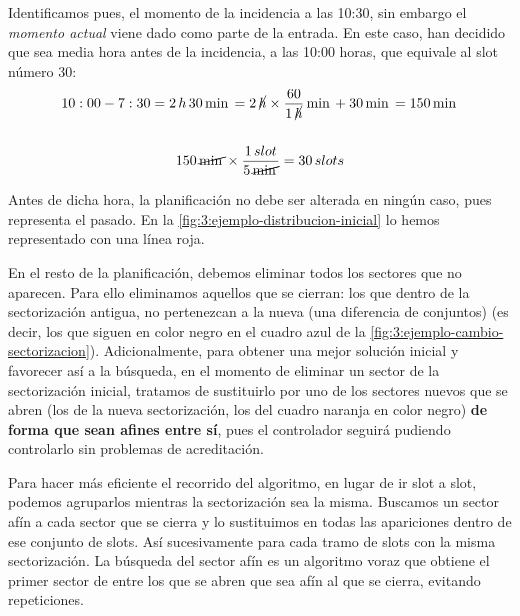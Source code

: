 Identificamos pues, el momento de la incidencia a las 10:30, sin embargo el \textit{momento actual} viene dado como parte de la entrada. En este caso, han decidido que sea media hora antes de la incidencia, a las 10:00 horas, que equivale al slot número 30:
\begin{gather*}
10:00 - 7:30 = 2 \,h \,30 \,\min = 2 \, \cancel{h} \times \frac{60}{1 \,\cancel{h}}\,\min + 30\,\min = 150\,\min\\\\
150 \,\cancel{\min} \times \frac{1\,slot}{5\,\cancel{\min}} = 30\,slots
\end{gather*}

Antes de dicha hora, la planificación no debe ser alterada en ningún caso, pues representa el pasado. En la 
\autoref{fig:3:ejemplo-distribucion-inicial} lo hemos representado con una línea roja. 

En el resto de la planificación, debemos eliminar todos los sectores que no aparecen. Para ello eliminamos aquellos que se cierran: los que dentro de la sectorización antigua, no pertenezcan a la nueva (una diferencia de conjuntos) (es decir, los que siguen en color negro en el cuadro azul de la \autoref{fig:3:ejemplo-cambio-sectorizacion}). 
Adicionalmente, para obtener una mejor solución inicial y favorecer así a la búsqueda, en el momento de eliminar un sector de la sectorización inicial, tratamos de sustituirlo por uno de los sectores nuevos que se abren (los de la nueva sectorización, los del cuadro naranja en color negro) \textbf{de forma que sean afines entre sí}, pues el controlador seguirá pudiendo controlarlo sin problemas de acreditación. %

Para hacer más eficiente el recorrido del algoritmo, en lugar de ir slot a slot, podemos agruparlos mientras la sectorización sea la misma. Buscamos un sector afín a cada sector que se cierra y lo sustituimos en todas las apariciones dentro de ese conjunto de slots. Así sucesivamente para cada tramo de slots con la misma sectorización. 
La búsqueda del sector afín es un algoritmo voraz que obtiene el primer sector de entre los que se abren que sea afín al que se cierra, evitando repeticiones.


